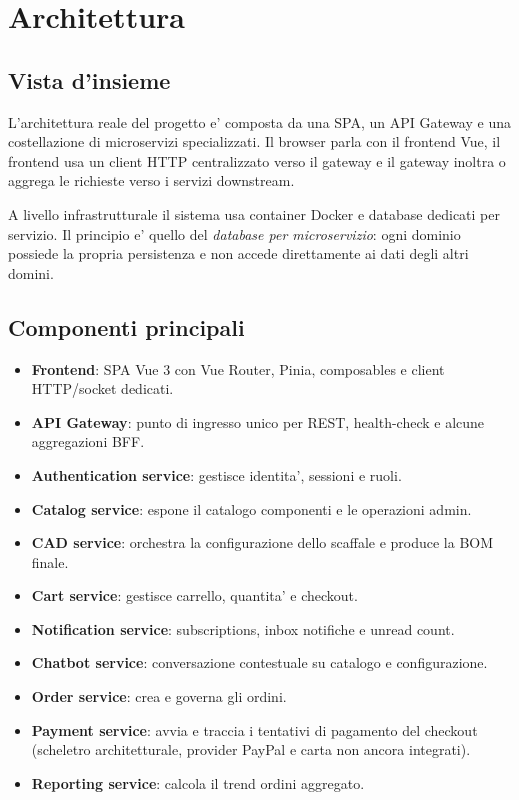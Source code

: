 \chapter{Architettura}

\section{Vista d'insieme}

L'architettura reale del progetto e' composta da una SPA, un API Gateway e una costellazione di microservizi specializzati. Il browser parla con il frontend Vue, il frontend usa un client HTTP centralizzato verso il gateway e il gateway inoltra o aggrega le richieste verso i servizi downstream.

A livello infrastrutturale il sistema usa container Docker e database dedicati per servizio. Il principio e' quello del \emph{database per microservizio}: ogni dominio possiede la propria persistenza e non accede direttamente ai dati degli altri domini.

\section{Componenti principali}

\begin{itemize}
\item \textbf{Frontend}: SPA Vue 3 con Vue Router, Pinia, composables e client HTTP/socket dedicati.
\item \textbf{API Gateway}: punto di ingresso unico per REST, health-check e alcune aggregazioni BFF.
\item \textbf{Authentication service}: gestisce identita', sessioni e ruoli.
\item \textbf{Catalog service}: espone il catalogo componenti e le operazioni admin.
\item \textbf{CAD service}: orchestra la configurazione dello scaffale e produce la BOM finale.
\item \textbf{Cart service}: gestisce carrello, quantita' e checkout.
\item \textbf{Notification service}: subscriptions, inbox notifiche e unread count.
\item \textbf{Chatbot service}: conversazione contestuale su catalogo e configurazione.
\item \textbf{Order service}: crea e governa gli ordini.
\item \textbf{Payment service}: avvia e traccia i tentativi di pagamento del checkout (scheletro architetturale, provider PayPal e carta non ancora integrati).
\item \textbf{Reporting service}: calcola il trend ordini aggregato.
\end{itemize}

